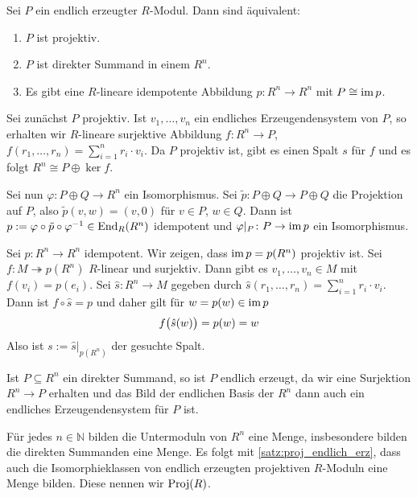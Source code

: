 \begin{satz}[{name=[{Äquivalenzen zur Projektivität endlich erzeugter Moduln}]},label=satz:proj_endlich_erz]
	Sei $P$ ein endlich erzeugter $R$-Modul.
	Dann sind äquivalent:
	\begin{enumerate}[1)]
		\item $P$ ist projektiv.
		\item $P$ ist direkter Summand in einem $R^n$.
		\item Es gibt eine $R$-lineare idempotente Abbildung $p \colon R^n \to R^n$ mit $P \cong \im p$.
	\end{enumerate}
\end{satz}
\begin{beweis}
	Sei zunächst $P$ projektiv.
	Ist $v_1,\ldots ,v_n$ ein endliches Erzeugendensystem von $P$, so erhalten wir $R$-lineare surjektive Abbildung $f \colon R^n \to P$, $f(r_1,\ldots,r_n)=\sum_{i=1}^n r_i \cdot v_i$.
	Da $P$ projektiv ist, gibt es einen Spalt $s$ für $f$ und es folgt $R^n \cong P \oplus \ker f$.
	
	Sei nun $\varphi \colon P \oplus Q \to R^n$ ein Isomorphismus.
	Sei $\tilde{p} \colon P \oplus  Q \to P \oplus Q$ die Projektion auf $P$, also $\tilde{p} (v,w) = (v,0)$ für $v \in P$, $w \in Q$.
	Dann ist $p := \varphi \circ \tilde{p} \circ \varphi^{-1} \in \End_R(R^n)$ idempotent und $\varphi|_{P} \colon P \to \im p$ ein Isomorphismus.
	
	Sei $p \colon R^n \to R^n$ idempotent.
	Wir zeigen, dass $\im p = p(R^n)$ projektiv ist.
	Sei $f \colon M \twoheadrightarrow p(R^n)$ $R$-linear und surjektiv.
	Dann gibt es $v_1,\ldots ,v_n \in M$ mit $f(v_i)= p(e_i)$.
	Sei $\hat{s} \colon R^n \to M$ gegeben durch $\hat{s}(r_1,\ldots ,r_n)=\sum_{i=1}^{n} r_i \cdot v_i$.
	Dann ist $f \circ \hat{s} =p$ und daher gilt für $w =p(w) \in \im p$
	\[
		f \enbrace[\big]{\hat{s}(w)} =p(w)=w
	\]
	Also ist $s:= \hat{s}|_{p(R^n)}$ der gesuchte Spalt.
\end{beweis}

\begin{bemerkung}[{name=[{direkte Summanden des $R^n$ sind endlich erzeugt}]}]
	Ist $P \subseteq R^n$ ein direkter Summand, so ist $P$ endlich erzeugt, da wir eine Surjektion $R^n \to P$ erhalten und das Bild der endlichen Basis der $R^n$ dann auch ein endliches Erzeugendensystem für $P$ ist.
\end{bemerkung}

\begin{bemerkung}[{name=[{Menge der Isomorphieklassen von endlich erzeugten projektiven Moduln}]}]
	Für jedes $n \in \mathbb{N}$ bilden die Untermoduln von $R^n$ eine Menge, insbesondere bilden die direkten Summanden eine Menge.
	Es folgt mit \autoref{satz:proj_endlich_erz}, dass auch die Isomorphieklassen von endlich erzeugten projektiven $R$-Moduln eine Menge bilden.
	Diese nennen wir $\Proj(R)$.
\end{bemerkung}

